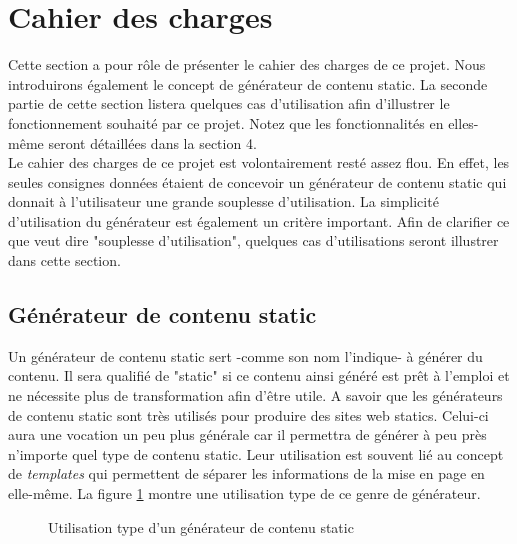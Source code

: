 \section{Cahier des charges}

	Cette section a pour rôle de présenter le cahier des charges de ce projet. Nous introduirons également le concept de générateur de contenu static. La seconde partie de cette section listera quelques cas d'utilisation afin d'illustrer le fonctionnement souhaité par ce projet. Notez que les fonctionnalités en elles-même seront détaillées dans la section 4.\\
	
	Le cahier des charges de ce projet est volontairement resté assez flou. En effet, les seules consignes données étaient de concevoir un générateur de contenu static qui donnait à l'utilisateur une grande souplesse d'utilisation. La simplicité d'utilisation du générateur est également un critère important. Afin de clarifier ce que veut dire "souplesse d'utilisation", quelques cas d'utilisations seront illustrer dans cette section.\\
	
	
	\subsection{Générateur de contenu static}
	
		Un générateur de contenu static sert -comme son nom l'indique- à générer du contenu. Il sera qualifié de "static" si ce contenu ainsi généré est prêt à l'emploi et ne nécessite plus de transformation afin d'être utile. A savoir que les générateurs de contenu static sont très utilisés pour produire des sites web statics. Celui-ci aura une vocation un peu plus générale car il permettra de générer à peu près n'importe quel type de contenu static. Leur utilisation est souvent lié au concept de \textit{templates} qui permettent de séparer les informations de la mise en page en elle-même. La figure \ref{fig:use_of_generator} montre une utilisation type de ce genre de générateur.\\
		
		\begin{figure}
			\begin{center}
			\caption{Utilisation type d'un générateur de contenu static}
			\label{fig:use_of_generator}
			\end{center}
		\end{figure}

